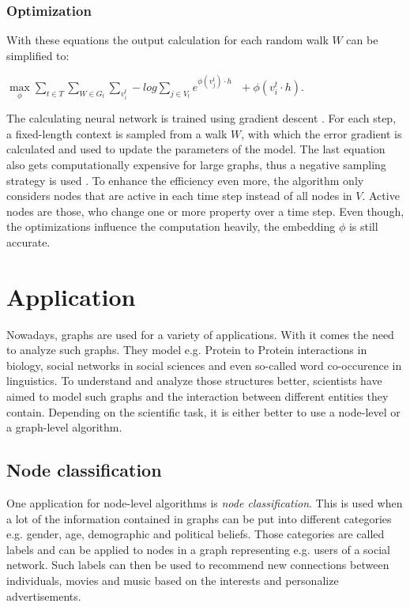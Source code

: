 \documentclass[sigconf]{acmart}
\begin{document}
\subsubsection{Optimization}
With these equations the output calculation for each random walk \(W\) can be simplified to: 
\begin{center}
  \(\max\limits_\phi \sum\limits_{t \in T}\sum\limits_{W\in G_t}\sum\limits_{v_i^t} -log\sum\limits_{j\in V_t} e^{\phi(v_j^t)\cdot h}\:\:\: +\phi(v_i^t \cdot h)\).
\end{center}
The calculating neural network is trained using gradient descent \cite{Ruder.15.09.2016}. For each step, a fixed-length context is sampled from a walk \(W\), with which the error gradient is calculated and used to update the parameters of the model.
The last equation also gets computationally expensive for large graphs, thus a negative sampling strategy is used \cite{Goldberg.15.02.2014}. To enhance the efficiency even more, 
the algorithm only considers nodes that are active in each time step instead of all nodes in \(V\). Active nodes are those, who change one or more property over a time step.
Even though, the optimizations influence the computation heavily, the embedding \(\phi\) is still accurate. \cite{Beladev.2020}


\section{Application}
Nowadays, graphs are used for a variety of applications. With it comes the need to analyze such graphs. They model e.g. Protein to Protein interactions in biology, social networks in social sciences and even  so-called word co-occurence in linguistics.
To understand and analyze those structures better, scientists have aimed to model such graphs and the interaction between different entities they contain.
Depending on the scientific task, it is either better to use a node-level or a graph-level algorithm\cite{Goyal.2018}.


\subsection{Node classification}
One application for node-level algorithms is \emph{node classification}. This is used when a lot of the information contained in graphs can be put into different categories e.g. gender, age, demographic and political beliefs. Those categories are called labels and can be applied to nodes in a graph representing e.g. users of a social network.
Such labels can then be used to recommend new connections between individuals, movies and music based on the interests and personalize advertisements.
\end{document}
